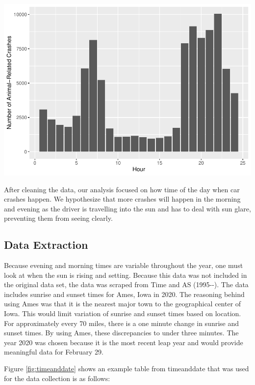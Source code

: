 \documentclass[conference,final,]{IEEEtran}
\begin{document}
\begin{center}\includegraphics[width=0.9\columnwidth]{CAUSE_files/figure-latex/unnamed-chunk-1-1} \end{center}

After cleaning the data, our analysis focused on how time of the day when car crashes happen. We hypothesize that more crashes will happen in the morning and evening as the driver is travelling into the sun and has to deal with sun glare, preventing them from seeing clearly.

\hypertarget{data-extraction}{%
\subsection{Data Extraction}\label{data-extraction}}

Because evening and morning times are variable throughout the year, one must look at when the sun is rising and setting. Because this data was not included in the original data set, the data was scraped from Time and AS (1995-\/-). The data includes sunrise and sunset times for Ames, Iowa in 2020. The reasoning behind using Ames was that it is the nearest major town to the geographical center of Iowa. This would limit variation of sunrise and sunset times based on location. For approximately every 70 miles, there is a one minute change in sunrise and sunset times. By using Ames, these discrepancies to under three minutes. The year 2020 was chosen because it is the most recent leap year and would provide meaningful data for February 29.

Figure \ref{fig:timeanddate} shows an example table from timeanddate that was used for the data collection is as follows:
\end{document}
